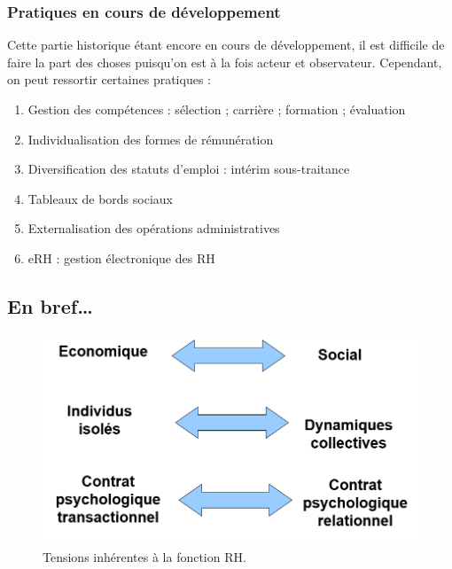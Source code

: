 \documentclass[12pt]{article}
\begin{document}
		\subsubsection{Pratiques en cours de développement}
		
		Cette partie historique étant encore en cours de développement, il est difficile de faire la part des choses puisqu'on est à la fois acteur et observateur. Cependant, on peut ressortir certaines pratiques :
		
		\begin{enumerate}
		 \item Gestion des compétences :
		    \subitem sélection ;
		    \subitem carrière ;
		    \subitem formation ;
		    \subitem évaluation
		 \item Individualisation des formes de rémunération
		 \item Diversification des statuts d'emploi :
		    \subitem intérim
		    \subitem sous-traitance
		 \item Tableaux de bords sociaux
		 \item Externalisation des opérations administratives
		 \item eRH : gestion électronique des RH
		\end{enumerate}

		
	\subsection{En bref\ldots}
	
	  \begin{figure}[h]
	  	\begin{center}
	  	\includegraphics[scale=0.5]{tensions_fonction_RH.png}
	  	\caption{Tensions inhérentes à la fonction RH.}
	  	\end{center}
	  \end{figure}
\end{document}
